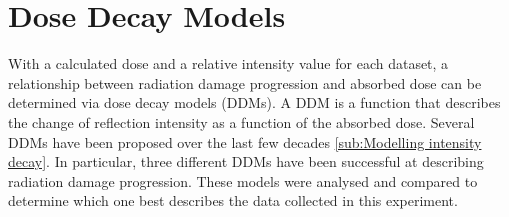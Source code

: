 \section{Dose Decay Models}
\label{sec:Dose Decay Models}
With a calculated dose and a relative intensity value for each dataset, a relationship between radiation damage progression and absorbed dose can be determined via dose decay models (DDMs).
A DDM is a function that describes the change of reflection intensity as a function of the absorbed dose.
Several DDMs have been proposed over the last few decades \ref{sub:Modelling intensity decay}.
In particular, three different DDMs have been successful at describing radiation damage progression.
These models were analysed and compared to determine which one best describes the data collected in this experiment.

